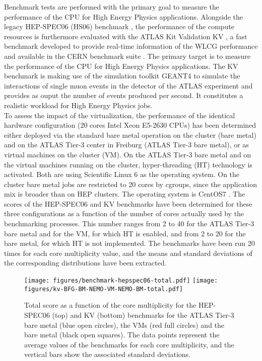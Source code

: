 Benchmark tests are performed with the primary goal to measure the performance of the CPU for High Energy Physics applications. 
Alongside the legacy HEP-SPEC06 (HS06) benchmark \cite{Hepspec}, the performance of the compute resources is furthermore evaluated with the ATLAS Kit Validation
KV \cite{DeSalvo:2010zza}, a fast benchmark developed to provide real-time information of the WLCG performance and available in the CERN benchmark suite \cite{Alef:2017jyx}.
The primary target is to measure the performance of the CPU for High Energy Physics applications.
The KV benchmark is making use of the simulation toolkit GEANT4 \cite{Agostinelli:2002hh} to simulate the interactions of single muon events in the detector of the ATLAS experiment
and provides as ouput the number of events produced per second. It constitutes a realistic workload for High Energy Physics jobs. \\

To assess the impact of the virtualization, the performance of the identical hardware configuration (20 cores Intel Xeon E5-2630 CPUs) has been determined either deployed via
the standard bare metal operation on the \NEMO cluster (\NEMO bare metal) and on the ATLAS Tier-3 center in Freiburg (ATLAS Tier-3 bare metal), or as virtual machines on the
\NEMO cluster (\NEMO VM). On the ATLAS Tier-3 bare metal and on the virtual machines running on the \NEMO cluster, hyper-threading (HT) technology is activated. Both are using Scientific
Linux 6 \cite{SL6} as the operating system.
On the cluster \NEMO bare metal jobs are restricted to 20 cores by cgroups, since the application mix is broader than on HEP clusters. The operating system is CentOS7 \cite{CentOS7}.
The scores of the HEP-SPEC06 and KV benchmarks have been determined for these three configurations as a function of the number of cores actually used by the benchmarking processes.
This number ranges from 2 to 40 for the ATLAS Tier-3 bare metal and for the \NEMO VM, for which HT is enabled, and from 2 to 20 for the \NEMO bare metal, for which HT is not implemented.
The benchmarks have been run 20 times for each core multiplicity value, and the means and standard deviations of the corresponding distributions have been extracted. \\

\begin{figure}[htbp]
\centering
\texttt{[image: figures/benchmark-hepspec06-total.pdf]}
\texttt{[image: figures/kv-BFG-BM-NEMO-VM-NEMO-BM-total.pdf]} 
\caption{Total score as a function of the core multiplicity for the HEP-SPEC06 (top) and KV (bottom) benchmarks for the ATLAS Tier-3 bare metal (blue open circles),
the \NEMO VMs (red full circles) and the \NEMO bare metal (black open squares). The data points represent the average values of the benchmarks for each core multiplicity,
and the vertical bars show the associated standard deviations.}
\label{bmk-total}
\end{figure}

